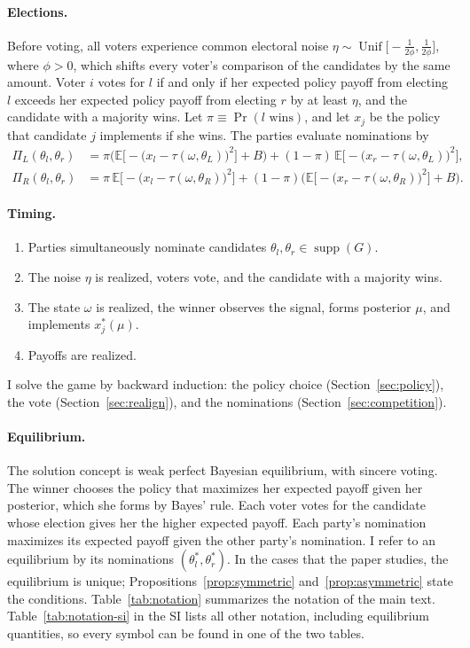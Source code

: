 \documentclass[12pt,letterpaper]{article}
\begin{document}
\paragraph{Elections.}
Before voting, all voters experience common electoral noise $\eta\sim\operatorname{Unif}\big[-\tfrac{1}{2\phi},\tfrac{1}{2\phi}\big]$, where $\phi>0$, which shifts every voter's comparison of the candidates by the same amount. Voter $i$ votes for $l$ if and only if her expected policy payoff from electing $l$ exceeds her expected policy payoff from electing $r$ by at least $\eta$, and the candidate with a majority wins. Let $\pi\equiv\Pr(l\text{ wins})$, and let $x_j$ be the policy that candidate $j$ implements if she wins. The parties evaluate nominations by
\begin{align*}
\Pi_L(\theta_l,\theta_r)&=\pi\Big(\mathbb{E}\big[-\big(x_l-\tau(\omega,\theta_L)\big)^2\big]+B\Big)+(1-\pi)\,\mathbb{E}\big[-\big(x_r-\tau(\omega,\theta_L)\big)^2\big],\\
\Pi_R(\theta_l,\theta_r)&=\pi\,\mathbb{E}\big[-\big(x_l-\tau(\omega,\theta_R)\big)^2\big]+(1-\pi)\Big(\mathbb{E}\big[-\big(x_r-\tau(\omega,\theta_R)\big)^2\big]+B\Big).
\end{align*}

\paragraph{Timing.}
\begin{enumerate}
  \item Parties simultaneously nominate candidates $\theta_l,\theta_r\in\operatorname{supp}(G)$.
  \item The noise $\eta$ is realized, voters vote, and the candidate with a majority wins.
  \item The state $\omega$ is realized, the winner observes the signal, forms posterior $\mu$, and implements $x^*_j(\mu)$.
  \item Payoffs are realized.
\end{enumerate}
I solve the game by backward induction: the policy choice (Section~\ref{sec:policy}), the vote (Section~\ref{sec:realign}), and the nominations (Section~\ref{sec:competition}).

\paragraph{Equilibrium.}
The solution concept is weak perfect Bayesian equilibrium, with sincere voting. The winner chooses the policy that maximizes her expected payoff given her posterior, which she forms by Bayes' rule. Each voter votes for the candidate whose election gives her the higher expected payoff. Each party's nomination maximizes its expected payoff given the other party's nomination. I refer to an equilibrium by its nominations $(\theta_l^*,\theta_r^*)$. In the cases that the paper studies, the equilibrium is unique; Propositions~\ref{prop:symmetric} and~\ref{prop:asymmetric} state the conditions.
Table~\ref{tab:notation} summarizes the notation of the main text. Table~\ref{tab:notation-si} in the SI lists all other notation, including equilibrium quantities, so every symbol can be found in one of the two tables.
\end{document}
